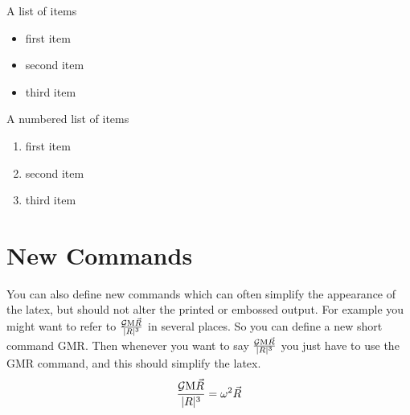 \documentclass[a4paper]{article}
\begin{document}
A list of items
\begin{itemize}
\item{ first item} 
\item{ second item} 
\item{ third item} 
\end{itemize} 
 
A numbered list of items 
\begin{enumerate}
\item{ first item} 
\item{ second item} 
\item{ third item} 
\end{enumerate} 

\section{New Commands} 

You can also define new commands which can often simplify the
appearance of the latex, but should not alter the printed or embossed
output. For example you might want to refer to $\frac{{\cal G}
{\mathrm M} \vec{R}}{|R|^3}$ in several places. So you can define a
new short command GMR.  
\newcommand{\GMR}{\frac{ {\cal G }{\mathrm M} \vec{R}}{|R|^3}} 
Then whenever you want to say $\GMR$ you just have to
use the GMR command, and this should simplify the latex.
$$
\GMR = \omega^2 \vec{R} 
$$
\end{document}
